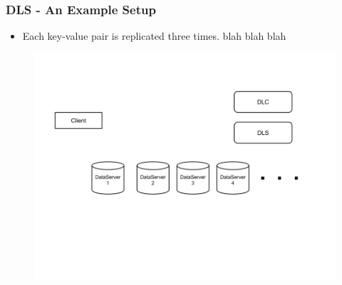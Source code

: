 \documentclass{beamer}
\begin{document}
\begin{frame}
  \frametitle{DLS - An Example Setup}
  \begin{itemize}
  \item Each key-value pair is replicated three times. blah blah blah
    \newline

  \end{itemize}
  \begin{figure}
    \begin{center}
      \centerline{\includegraphics[scale=0.40]{img/DLS_Example1.png}}
    \end{center}
  \end{figure}

\end{frame}
\end{document}
